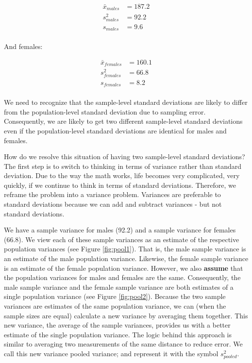 \documentclass[
]{krantz}
\begin{document}
\[
\begin{aligned} 
\bar{x}_{males} &= 187.2 \\
s_{males}^2 &= 92.2 \\
s_{males} &= 9.6 \\
\end{aligned} 
\]

And females:

\[
\begin{aligned} 
\bar{x}_{females} &= 160.1 \\
s_{females}^2 &= 66.8 \\
s_{females} &= 8.2 \\
\end{aligned} 
\]

We need to recognize that the sample-level standard deviations are likely to differ from the population-level standard deviation due to sampling error. Consequently, we are likely to get two different sample-level standard deviations even if the population-level standard deviations are identical for males and females.

How do we resolve this situation of having two sample-level standard deviations? The first step is to switch to thinking in terms of variance rather than standard deviation. Due to the way the math works, life becomes very complicated, very quickly, if we continue to think in terms of standard deviations. Therefore, we reframe the problem into a variance problem. Variances are preferable to standard deviations because we can add and subtract variances - but not standard deviations.

We have a sample variance for males (92.2) and a sample variance for females (66.8). We view each of these sample variances as an estimate of the respective population variances (see Figure \ref{fig:pool1}). That is, the male sample variance is an estimate of the male population variance. Likewise, the female sample variance is an estimate of the female population variance. However, we also \textbf{assume} that the population variances for males and females are the same. Consequently, the male sample variance and the female sample variance are both estimates of a single population variance (see Figure \ref{fig:pool2}). Because the two sample variances are estimates of the same population variance, we can (when the sample sizes are equal) calculate a new variance by averaging them together. This new variance, the average of the sample variances, provides us with a better estimate of the single population variance. The logic behind this approach is similar to averaging two measurements of the same distance to reduce error. We call this new variance pooled variance; and represent it with the symbol \(s_{pooled}^2\).
\end{document}
